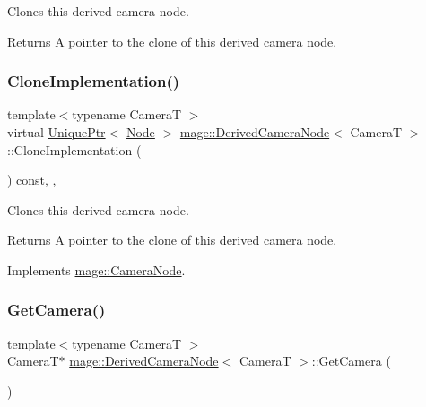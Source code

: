 Clones this derived camera node.

\begin{DoxyReturn}{Returns}
A pointer to the clone of this derived camera node. 
\end{DoxyReturn}
\hypertarget{classmage_1_1_derived_camera_node_aa965751029ebd6b41d3805b499a8304e}{}\label{classmage_1_1_derived_camera_node_aa965751029ebd6b41d3805b499a8304e} 
\subsubsection{\texorpdfstring{Clone\+Implementation()}{CloneImplementation()}}
{\footnotesize\ttfamily template$<$typename CameraT $>$ \\
virtual \hyperlink{namespacemage_a3316d7143a973e37adf1110f2e80ca31}{Unique\+Ptr}$<$ \hyperlink{classmage_1_1_node}{Node} $>$ \hyperlink{classmage_1_1_derived_camera_node}{mage\+::\+Derived\+Camera\+Node}$<$ CameraT $>$\+::Clone\+Implementation (\begin{DoxyParamCaption}{ }\end{DoxyParamCaption}) const\hspace{0.3cm}{\ttfamily [override]}, {\ttfamily [private]}, {\ttfamily [virtual]}}

Clones this derived camera node.

\begin{DoxyReturn}{Returns}
A pointer to the clone of this derived camera node. 
\end{DoxyReturn}


Implements \hyperlink{classmage_1_1_camera_node_a002d3a2b41cda270a26ca5d8f3a17f55}{mage\+::\+Camera\+Node}.

\hypertarget{classmage_1_1_derived_camera_node_a423d9e416aec8ade92d0d2211d40de39}{}\label{classmage_1_1_derived_camera_node_a423d9e416aec8ade92d0d2211d40de39} 
\subsubsection{\texorpdfstring{Get\+Camera()}{GetCamera()}\hspace{0.1cm}{\footnotesize\ttfamily [1/2]}}
{\footnotesize\ttfamily template$<$typename CameraT $>$ \\
CameraT$\ast$ \hyperlink{classmage_1_1_derived_camera_node}{mage\+::\+Derived\+Camera\+Node}$<$ CameraT $>$\+::Get\+Camera (\begin{DoxyParamCaption}{ }\end{DoxyParamCaption})\hspace{0.3cm}{\ttfamily [noexcept]}}

